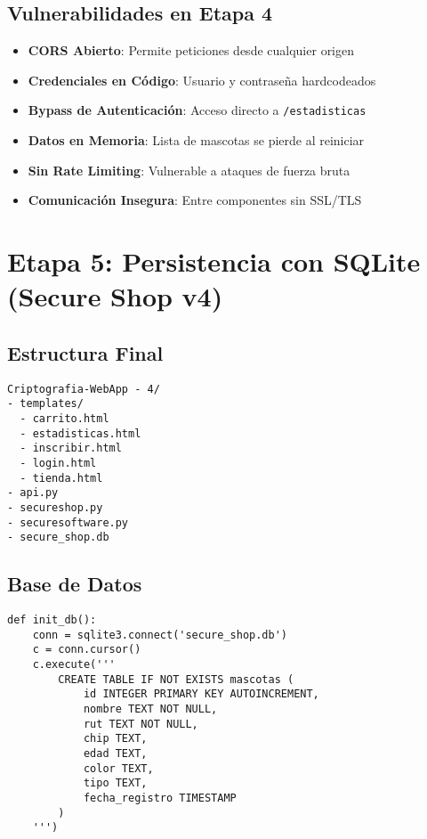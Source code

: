 \subsection{Vulnerabilidades en Etapa 4}
\begin{itemize}
    \item \textbf{CORS Abierto}: Permite peticiones desde cualquier origen
    \item \textbf{Credenciales en Código}: Usuario y contraseña hardcodeados
    \item \textbf{Bypass de Autenticación}: Acceso directo a \texttt{/estadisticas}
    \item \textbf{Datos en Memoria}: Lista de mascotas se pierde al reiniciar
    \item \textbf{Sin Rate Limiting}: Vulnerable a ataques de fuerza bruta
    \item \textbf{Comunicación Insegura}: Entre componentes sin SSL/TLS
\end{itemize}

\section{Etapa 5: Persistencia con SQLite (Secure Shop v4)}

\subsection{Estructura Final}
\begin{lstlisting}
Criptografia-WebApp - 4/
- templates/
  - carrito.html
  - estadisticas.html
  - inscribir.html
  - login.html
  - tienda.html
- api.py
- secureshop.py
- securesoftware.py
- secure_shop.db
\end{lstlisting}

\subsection{Base de Datos}
\begin{verbatim}
def init_db():
    conn = sqlite3.connect('secure_shop.db')
    c = conn.cursor()
    c.execute('''
        CREATE TABLE IF NOT EXISTS mascotas (
            id INTEGER PRIMARY KEY AUTOINCREMENT,
            nombre TEXT NOT NULL,
            rut TEXT NOT NULL,
            chip TEXT,
            edad TEXT,
            color TEXT,
            tipo TEXT,
            fecha_registro TIMESTAMP
        )
    ''')
\end{verbatim}

